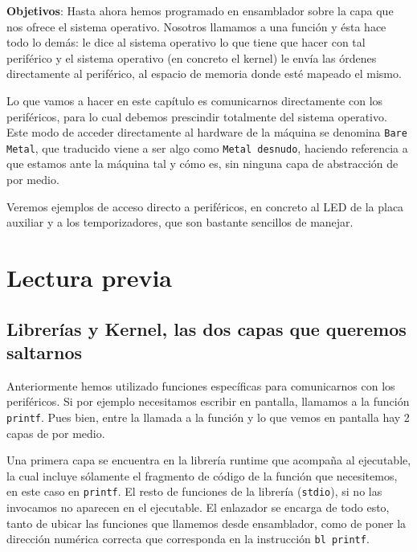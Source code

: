 

\label{chp:Subrut}
\minitoc

{\bf Objetivos}: Hasta ahora hemos programado en ensamblador sobre
la capa que nos ofrece el sistema operativo. Nosotros llamamos a una
función y ésta hace todo lo demás: le dice al sistema operativo lo
que tiene que hacer con tal periférico y el sistema operativo (en concreto
el kernel) le envía las órdenes directamente al periférico, al espacio
de memoria donde esté mapeado el mismo.

Lo que vamos a hacer en este capítulo es comunicarnos directamente con los
periféricos, para lo cual debemos prescindir totalmente del sistema operativo.
Este modo de acceder directamente al hardware de la máquina se denomina {\tt Bare Metal},
que traducido viene a ser algo como {\tt Metal desnudo}, haciendo referencia a
que estamos ante la máquina tal y cómo es, sin ninguna capa de abstracción de
por medio.

Veremos ejemplos de acceso directo a periféricos, en concreto al LED de la placa
auxiliar y a los temporizadores, que son bastante sencillos de manejar.

\section{Lectura previa}

\subsection{Librerías y Kernel, las dos capas que queremos saltarnos}

Anteriormente hemos utilizado funciones específicas para
comunicarnos con los periféricos. Si por ejemplo necesitamos escribir
en pantalla, llamamos a la función {\tt printf}. Pues bien, entre
la llamada a la función y lo que vemos en pantalla hay 2 capas de por medio.

Una primera capa se encuentra en la librería runtime que acompaña al
ejecutable, la cual incluye sólamente el fragmento de código de la
función que necesitemos, en este caso en {\tt printf}. El resto de
funciones de la librería ({\tt stdio}), si no las invocamos no aparecen
en el ejecutable. El enlazador se encarga de todo esto, tanto de ubicar
las funciones que llamemos desde ensamblador, como de poner la dirección
numérica correcta que corresponda en la instrucción {\tt bl printf}.

